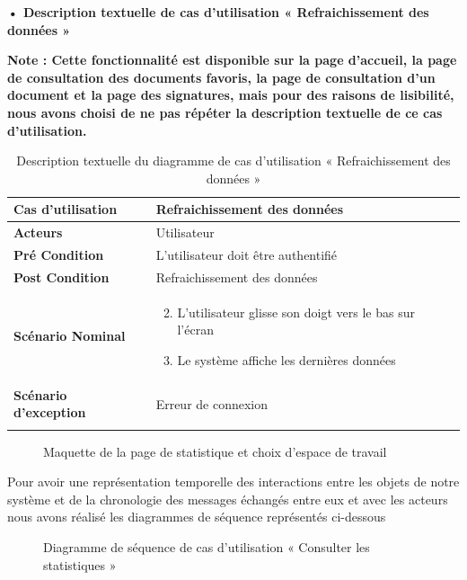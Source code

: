 \textbf{•	Description textuelle de cas d'utilisation « Refraichissement
des données »}

\textbf{Note : Cette fonctionnalité est disponible sur la page d'accueil, la page de consultation des documents favoris, la page de consultation d'un document et la page des signatures, mais pour des raisons de lisibilité, nous avons choisi de ne pas répéter la description textuelle de ce cas d'utilisation.}

\begin{longtable}{|p{5cm}|p{10cm}|}
\hline
\textbf{Cas d'utilisation}&Refraichissement des données\\
\hline
\textbf{Acteurs}&Utilisateur \\
\hline
\textbf{Pré Condition}&L'utilisateur doit être authentifié\\
\hline
\textbf{Post Condition}&Refraichissement des données\\
\hline
\textbf{Scénario Nominal}&
\vspace{-\baselineskip}
\begin{enumerate}
    \setcounter{enumi}{1}
      \item L'utilisateur glisse son doigt vers le bas sur l'écran
      \item Le système affiche les dernières données
\end{enumerate}\\
\hline
\textbf{Scénario d'exception}&Erreur de connexion\\
\hline
\caption{Description textuelle du diagramme de cas d'utilisation « Refraichissement des données »}
\label{tab:use_case_refraichissement_donnees}
\end{longtable}

\begin{figure}[H]
  \centering
  \caption{Maquette de la page de statistique et choix d'espace de travail}
  \label{fig:design_statistique}
\end{figure}


Pour avoir une représentation temporelle des interactions entre les objets de notre système et de la chronologie des messages échangés entre eux et avec les acteurs nous avons réalisé les diagrammes de séquence représentés ci-dessous

\begin{figure}[H]
  \centering
  \caption{Diagramme de séquence de cas d'utilisation « Consulter les statistiques »}
  \label{fig:sequence_view_stats}
\end{figure}

